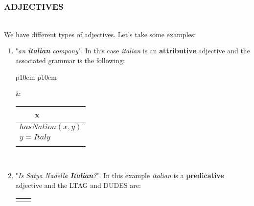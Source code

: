 \subsubsection{ADJECTIVES}\mbox{}\\
We have different types of adjectives. Let's take some examples:
\begin{enumerate}
\item "\textit{an \textbf{italian} company}". In this case \textit{italian} is an \textbf{attributive} adjective and the associated grammar is the following:
 \medskip
\begin{center}
\begin{tabular}{ p{10em} p{10em} }
	\label{tbl:grammar.attributiveAdjective}
	
	\begin{center}
		\begin{tikzpicture}
		\Tree [.NP [.ADJ italian ] [.NP$_1^\ast$ ] ]
		\end{tikzpicture}
	\end{center}
		
	&
	
	\begin{center}
		\begin{tabular}{|c|l|}
			\hline
			x & \mbox{}\\ 
			\hline
			\multicolumn{2}{|l|}{
				$hasNation(x,y)$
			} \\
			\multicolumn{2}{|l|}{
				$y=Italy$
			} \\
			\hline
			\multicolumn{2}{|l|}{
				\mbox{}
			} \\
			\hline
		\end{tabular}
	\end{center}	
	\\
\end{tabular}
\end{center}
\medskip

\item "\textit{Is Satya Nadella \textbf{Italian}?}". In this example \textit{italian} is a  \textbf{predicative} adjective and the LTAG and DUDES are:
\medskip
\begin{center}
\begin{tabular}{ p{10em} p{10em} }
	\label{tbl:grammar.predicativeAdjective}
	
	\begin{center}
		\begin{tikzpicture}
		\Tree [.DP  [.NP [.ADJ italian ] ] ]
		\end{tikzpicture}
	\end{center}
		

\end{tabular}
\end{center}
\end{enumerate}
